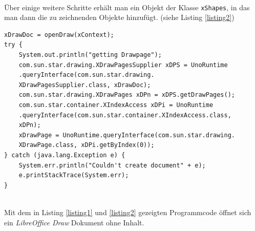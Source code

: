 \noindent
\hon{}
\\
\noindent
Über einige weitere Schritte erhält man ein Objekt der Klasse \verb|xShapes|, in das man dann die zu zeichnenden Objekte hinzufügt. (siehe Listing \ref{listing2})
\noindent
\lstset{language=Java}
\lstset{frame=lines}
\lstset{basicstyle=\footnotesize}
\begin{lstlisting}
xDrawDoc = openDraw(xContext);
try {
    System.out.println("getting Drawpage");
    com.sun.star.drawing.XDrawPagesSupplier xDPS = UnoRuntime
    .queryInterface(com.sun.star.drawing.
    XDrawPagesSupplier.class, xDrawDoc);
    com.sun.star.drawing.XDrawPages xDPn = xDPS.getDrawPages();
    com.sun.star.container.XIndexAccess xDPi = UnoRuntime
    .queryInterface(com.sun.star.container.XIndexAccess.class,
    xDPn);
    xDrawPage = UnoRuntime.queryInterface(com.sun.star.drawing.
    XDrawPage.class, xDPi.getByIndex(0));
} catch (java.lang.Exception e) {
    System.err.println("Couldn't create document" + e);
    e.printStackTrace(System.err);
}
\end{lstlisting}
\footnotemark[32]
\noindent
\\
\noindent
Mit dem in Listing \ref{listing1} und \ref{listing2} gezeigten Programmcode öffnet sich ein \textit{LibreOffice Draw} Dokument ohne Inhalt.

\noindent
{}
\label{XERML-JAVA}
\hon{}

